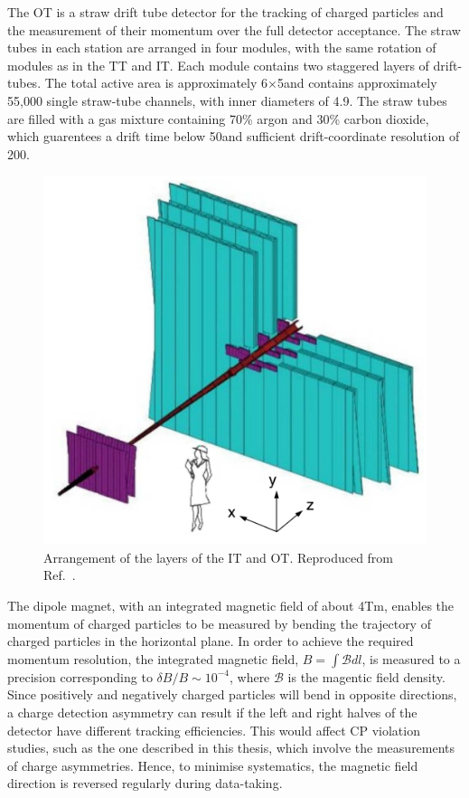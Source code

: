 The OT is a straw drift tube detector for the tracking of charged particles and
the measurement of their momentum over the full detector acceptance. The straw tubes in each station are arranged in four modules, with the same rotation of modules as in the TT and IT. Each module contains two staggered layers of drift-tubes. The total active area is approximately 6$\times$5\mma and contains approximately 55,000 single straw-tube channels, with inner diameters of 4.9\mm. The straw tubes are filled with a gas mixture containing 70\% argon and 30\% carbon dioxide, which guarentees a drift time below 50\ns and sufficient drift-coordinate resolution of 200\mum.

\begin{figure}
\centering
\includegraphics[width=0.5\linewidth]{figures/detector/InnerAndOuterTracker.pdf}
\caption{Arrangement of the layers of the IT and OT. Reproduced from Ref.~\cite{lhcbdetector2008}.}
\label{itandot}
\end{figure}

The dipole magnet, with an integrated magnetic field of about 4Tm, enables the momentum of charged particles to be measured by bending the trajectory of charged particles in the horizontal plane. In order to achieve the required momentum resolution, the integrated magnetic field, $B = \int{\mathcal{B} dl}$, is measured to a precision corresponding to $\delta B /B \sim 10^{-4}$, where $\mathcal{B}$ is the magentic field density. Since positively and negatively charged particles will bend in opposite directions, a charge detection asymmetry can result if the left and right halves of the detector have different tracking efficiencies. This would affect CP violation studies, such as the one described in this thesis, which involve the measurements of charge asymmetries. Hence, to minimise systematics, the magnetic field direction is reversed regularly during data-taking.

